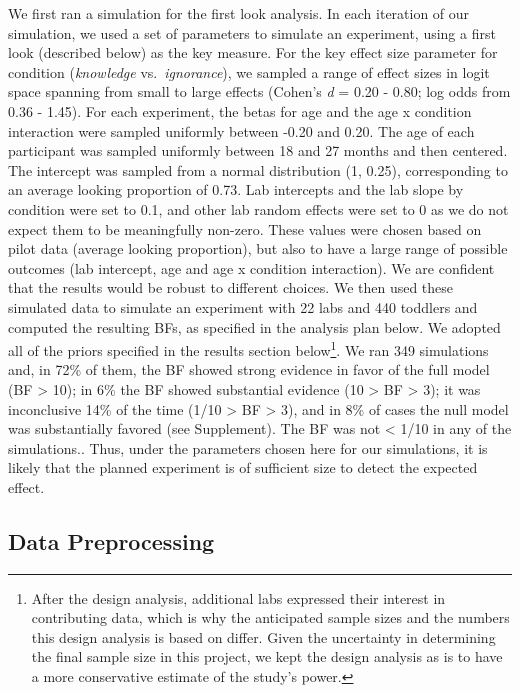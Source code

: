 \documentclass[
  man,floatsintext]{apa6}
\begin{document}
We first ran a simulation for the first look analysis. In each iteration of our simulation, we used a set of parameters to simulate an experiment, using a first look (described below) as the key measure. For the key effect size parameter for condition (\emph{knowledge} vs.~\emph{ignorance}), we sampled a range of effect sizes in logit space spanning from small to large effects (Cohen's \emph{d} = 0.20 - 0.80; log odds from 0.36 - 1.45). For each experiment, the betas for age and the age x condition interaction were sampled uniformly between -0.20 and 0.20. The age of each participant was sampled uniformly between 18 and 27 months and then centered. The intercept was sampled from a normal distribution (1, 0.25), corresponding to an average looking proportion of 0.73. Lab intercepts and the lab slope by condition were set to 0.1, and other lab random effects were set to 0 as we do not expect them to be meaningfully non-zero. These values were chosen based on pilot data (average looking proportion), but also to have a large range of possible outcomes (lab intercept, age and age x condition interaction). We are confident that the results would be robust to different choices. We then used these simulated data to simulate an experiment with 22 labs and 440 toddlers and computed the resulting BFs, as specified in the analysis plan below. We adopted all of the priors specified in the results section below\footnote{After the design analysis, additional labs expressed their interest in contributing data, which is why the anticipated sample sizes and the numbers this design analysis is based on differ. Given the uncertainty in determining the final sample size in this project, we kept the design analysis as is to have a more conservative estimate of the study's power.}. We ran 349 simulations and, in 72\% of them, the BF showed strong evidence in favor of the full model (BF \textgreater{} 10); in 6\% the BF showed substantial evidence (10 \textgreater{} BF \textgreater{} 3); it was inconclusive 14\% of the time (1/10 \textgreater{} BF \textgreater{} 3), and in 8\% of cases the null model was substantially favored (see Supplement). The BF was not \textless{} 1/10 in any of the simulations.. Thus, under the parameters chosen here for our simulations, it is likely that the planned experiment is of sufficient size to detect the expected effect.

\subsection{Data Preprocessing}\label{data-preprocessing}
\end{document}
